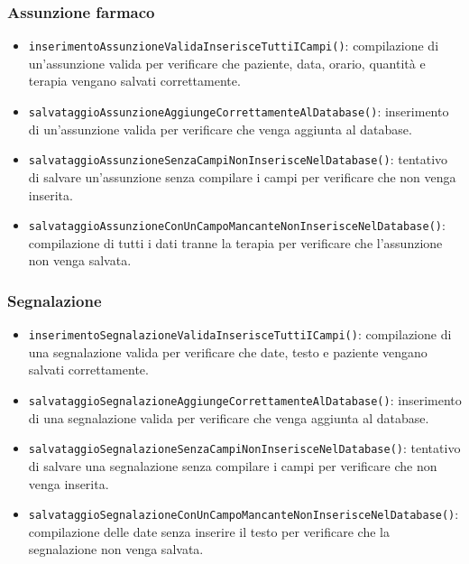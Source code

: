 \subsubsection*{Assunzione farmaco}

\begin{itemize}
	
	\item \texttt{inserimentoAssunzioneValidaInserisceTuttiICampi()}: compilazione di un'assunzione valida per verificare che paziente, data, orario, quantità e terapia vengano salvati correttamente.
	
	\item \texttt{salvataggioAssunzioneAggiungeCorrettamenteAlDatabase()}: inserimento di un'assunzione valida per verificare che venga aggiunta al database.
	
	\item \texttt{salvataggioAssunzioneSenzaCampiNonInserisceNelDatabase()}: tentativo di salvare un'assunzione senza compilare i campi per verificare che non venga inserita.
	
	\item \texttt{salvataggioAssunzioneConUnCampoMancanteNonInserisceNelDatabase()}: compilazione di tutti i dati tranne la terapia per verificare che l'assunzione non venga salvata.
	
\end{itemize}

\subsubsection*{Segnalazione}

\begin{itemize}
	
	\item \texttt{inserimentoSegnalazioneValidaInserisceTuttiICampi()}: compilazione di una segnalazione valida per verificare che date, testo e paziente vengano salvati correttamente.
	
	\item \texttt{salvataggioSegnalazioneAggiungeCorrettamenteAlDatabase()}: inserimento di una segnalazione valida per verificare che venga aggiunta al database.
	
	\item \texttt{salvataggioSegnalazioneSenzaCampiNonInserisceNelDatabase()}: tentativo di salvare una segnalazione senza compilare i campi per verificare che non venga inserita.
	
	\item \texttt{salvataggioSegnalazioneConUnCampoMancanteNonInserisceNelDatabase()}: compilazione delle date senza inserire il testo per verificare che la segnalazione non venga salvata.
	
\end{itemize}

